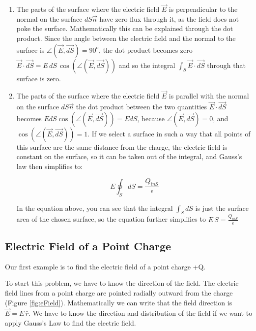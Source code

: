 \documentclass{ximera}
\begin{document}
\begin{enumerate}
\item  The parts of the surface where the electric field $\vec{E}$ is perpendicular to the normal on the surface $dS\vec{n}$ have zero flux through it, as the field does not poke the surface. Mathematically this can be explained through the dot product. Since the angle between the electric field and the normal to the surface is $\angle(\vec{E},\vec{dS})=90^o $, the dot product becomes zero $\vec{E} \cdot \vec{dS}= E \, dS \, \cos(\angle(\vec{E},\vec{dS}))$ and so the integral $\int_S \vec{E} \cdot \vec{dS}$ through that surface is zero. 
\item The parts of the surface where the electric field $\vec{E}$ is parallel with the normal on the surface $dS\vec{n}$ the dot product between the two quantities $\vec{E} \cdot \vec{dS}$ becomes $E dS  \cos(\angle(\vec{E},\vec{dS}))= E dS$, because $\angle(\vec{E},\vec{dS})=0$, and $\cos(\angle(\vec{E},\vec{dS}))=1$. If we select a surface in such a way that all points of this surface are the same distance from the charge, the electric field is constant on the surface, so it can be taken out of the integral, and Gauss's law then simplifies to:

\begin{equation}
 {E} \oint_S dS = \frac{Q_{inS}}{\epsilon}
\end{equation}

In the equation above, you can see that the integral $\int_S dS$ is just the surface area of the chosen surface, so the equation further simplifies to $E\,S=\frac{Q_{inS}}{\epsilon}$ 



\end{enumerate}
 
 
 
\subsection{Electric Field of a Point Charge}

Our first example is to find the electric field of a point charge +Q. 

To start this problem, we have to know the direction of the field. The electric field lines from a point charge are pointed radially outward from the charge (Figure \ref{fig:eField}). Mathematically we can write that the field direction is $\vec{E}  = E \, \hat{r} $. We have to know the direction and distribution of the field if we want to apply Gauss's Law to find the electric field.
\end{document}

